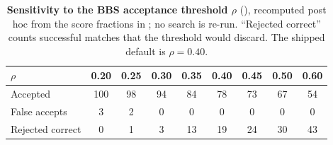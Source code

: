 \begin{table}[t]
\centering
\caption{\textbf{Sensitivity to the BBS acceptance threshold $\rho$} (), recomputed post hoc from the score fractions in ; no search is re-run. ``Rejected correct'' counts successful matches that the threshold would discard. The shipped default is $\rho=0.40$.}\label{tab:threshold}
\small
\begin{tabular}{@{}lcccccccc@{}}
\toprule
$\rho$ & 0.20 & 0.25 & 0.30 & 0.35 & \textbf{0.40} & 0.45 & 0.50 & 0.60 \\
\midrule
Accepted & 100 & 98 & 94 & 84 & 78 & 73 & 67 & 54 \\
False accepts & 3 & 2 & 0 & 0 & 0 & 0 & 0 & 0 \\
Rejected correct & 0 & 1 & 3 & 13 & 19 & 24 & 30 & 43 \\
\bottomrule
\end{tabular}
\end{table}
